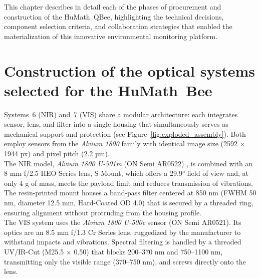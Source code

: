 
\noindent This chapter describes in detail each of the phases of procurement and construction of the HuMath\textregistered\ QBee, highlighting the technical decisions, component selection criteria, and collaboration strategies that enabled the materialization of this innovative environmental monitoring platform.\\



\section{Construction of the optical systems selected for the HuMath\textregistered\ Bee}

\noindent Systems~6 (NIR) and~7 (VIS) share a modular architecture: each integrates sensor, lens, and filter into a single housing that simultaneously serves as mechanical support and protection (see Figure~\ref{fig:exploded_assembly}). Both employ sensors from the \textit{Alvium 1800} family with identical image size (2592 × 1944 px) and pixel pitch (2.2 µm). \\

\noindent The NIR model, \textit{Alvium 1800 U-501m} (ON Semi AR0522) \cite{alliedvision_alvium1800U_501NIRm}, is combined with an 8 mm f/2.5 HEO Series lens, S-Mount, which offers a 29.9° field of view and, at only 4 g of mass, meets the payload limit and reduces transmission of vibrations. The resin-printed mount houses a band-pass filter centered at 850 nm (FWHM 50 nm, diameter 12.5 mm, Hard-Coated OD 4.0) that is secured by a threaded ring, ensuring alignment without protruding from the housing profile.\\

\noindent The VIS system uses the \textit{Alvium 1800 U-500c} sensor (ON Semi AR0521). Its optics are an 8.5 mm f/1.3 Cr Series lens, ruggedized by the manufacturer to withstand impacts and vibrations. Spectral filtering is handled by a threaded UV/IR-Cut (M25.5 × 0.50) that blocks 200–370 nm and 750–1100 nm, transmitting only the visible range (370–750 nm), and screws directly onto the lens.\\


